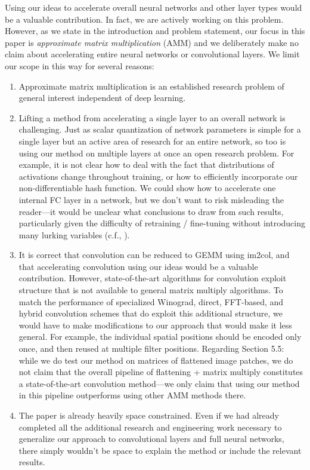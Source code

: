 Using our ideas to accelerate overall neural networks and other layer types would be a valuable contribution. In fact, we are actively working on this problem. However, as we state in the introduction and problem statement, our focus in this paper is \textit{approximate matrix multiplication} (AMM) and we deliberately make no claim about accelerating entire neural networks or convolutional layers. We limit our scope in this way for several reasons:
\begin{enumerate}
\item Approximate matrix multiplication is an established research problem of general interest independent of deep learning.
\item Lifting a method from accelerating a single layer to an overall network is challenging. Just as scalar quantization of network parameters is simple for a single layer but an active area of research for an entire network, so too is using our method on multiple layers at once an open research problem. For example, it is not clear how to deal with the fact that distributions of activations change throughout training, or how to efficiently incorporate our non-differentiable hash function.
We could show how to accelerate one internal FC layer in a network, but we don’t want to risk misleading the reader---it would be unclear what conclusions to draw from such results, particularly given the difficulty of retraining / fine-tuning without introducing many lurking variables (c.f., \cite{blalock2020}).
\item It is correct that convolution can be reduced to GEMM using im2col, and that accelerating convolution using our ideas would be a valuable contribution. However, state-of-the-art algorithms for convolution exploit structure that is not available to general matrix multiply algorithms. To match the performance of specialized Winograd, direct, FFT-based, and hybrid convolution schemes that do exploit this additional structure, we would have to make modifications to our approach that would make it less general. For example, the individual spatial positions should be encoded only once, and then reused at multiple filter positions. Regarding Section 5.5: while we do test our method on matrices of flattened image patches, we do not claim that the overall pipeline of flattening + matrix multiply constitutes a state-of-the-art convolution method---we only claim that using our method in this pipeline outperforms using other AMM methods there.
\item The paper is already heavily space constrained. Even if we had already completed all the additional research and engineering work necessary to generalize our approach to convolutional layers and full neural networks, there simply wouldn't be space to explain the method or include the relevant results.
\end{enumerate}

